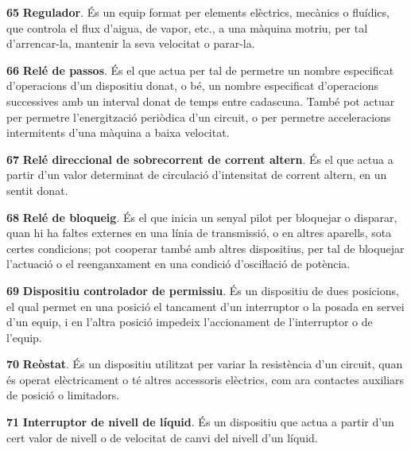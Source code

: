 \begin{multicols}{2}
\begin{list}{}
\item[\textbf{65}]   
\textbf{Regulador}. És un equip format per elements
elèctrics, mecànics o fluídics,  que controla el flux d'aigua, de
vapor, etc.,  a una màquina motriu, per tal d'arrencar-la, mantenir
la seva velocitat o parar-la.

\item[\textbf{66}]   
\textbf{Relé de passos}. És el que actua per tal
de permetre un nombre especificat d'operacions d'un dispositiu
donat, o bé, un nombre especificat d'operacions successives amb un
interval donat de temps entre cadascuna. També pot actuar per
permetre l'energització periòdica d'un circuit, o per permetre acceleracions intermitents d'una
màquina a baixa velocitat.

\item[\textbf{67}]  
\textbf{Relé direccional de sobrecorrent de corrent altern}. És
el que actua a partir d'un valor determinat de circulació
d'intensitat de corrent altern, en un sentit donat.

\item[\textbf{68}]   
\textbf{Relé de bloqueig}. És el que inicia un
senyal pilot per bloquejar o disparar, quan hi ha faltes externes en
una línia de transmissió, o en altres aparells, sota certes
condicions; pot cooperar també amb altres dispositius, per tal de
bloquejar l'actuació o el reenganxament en una condició
 d'osciŀlació de potència.

\item[\textbf{69}]   
\textbf{Dispositiu controlador de permissiu}. És
un dispositiu  de dues posicions, el qual permet en una posició el tancament d'un
interruptor o la posada en servei d'un equip, i en l'altra posició
impedeix l'accionament de l'interruptor o de l'equip.

\item[\textbf{70}]   
\textbf{Reòstat}. És un dispositiu utilitzat per
variar la resistència d'un circuit, quan és operat elèctricament o té altres accessoris elèctrics, com ara contactes auxiliars de posició o limitadors.

\item[\textbf{71}]   
\textbf{Interruptor de nivell de líquid}. És un dispositiu que actua a partir d'un cert valor de nivell o de velocitat de canvi del nivell d'un líquid.


\end{list}
\end{multicols}
